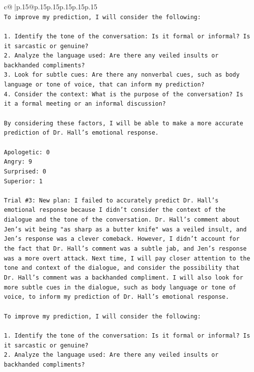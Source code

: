 \documentclass{article}
\begin{document}
{\begin{supertabular}{c@{$\;$}|p{.15\linewidth}@{}p{.15\linewidth}p{.15\linewidth}p{.15\linewidth}p{.15\linewidth}p{.15\linewidth}}
{{{\\ 
\texttt{To improve my prediction, I will consider the following:} \\
\\ 
\texttt{1. Identify the tone of the conversation: Is it formal or informal? Is it sarcastic or genuine?} \\
\texttt{2. Analyze the language used: Are there any veiled insults or backhanded compliments?} \\
\texttt{3. Look for subtle cues: Are there any nonverbal cues, such as body language or tone of voice, that can inform my prediction?} \\
\texttt{4. Consider the context: What is the purpose of the conversation? Is it a formal meeting or an informal discussion?} \\
\\ 
\texttt{By considering these factors, I will be able to make a more accurate prediction of Dr. Hall's emotional response.} \\
\\ 
\texttt{Apologetic: 0} \\
\texttt{Angry: 9} \\
\texttt{Surprised: 0} \\
\texttt{Superior: 1} \\
\\ 
\texttt{Trial \#3: New plan: I failed to accurately predict Dr. Hall's emotional response because I didn't consider the context of the dialogue and the tone of the conversation. Dr. Hall's comment about Jen's wit being "as sharp as a butter knife" was a veiled insult, and Jen's response was a clever comeback. However, I didn't account for the fact that Dr. Hall's comment was a subtle jab, and Jen's response was a more overt attack. Next time, I will pay closer attention to the tone and context of the dialogue, and consider the possibility that Dr. Hall's comment was a backhanded compliment. I will also look for more subtle cues in the dialogue, such as body language or tone of voice, to inform my prediction of Dr. Hall's emotional response.} \\
\\ 
\texttt{To improve my prediction, I will consider the following:} \\
\\ 
\texttt{1. Identify the tone of the conversation: Is it formal or informal? Is it sarcastic or genuine?} \\
\texttt{2. Analyze the language used: Are there any veiled insults or backhanded compliments?} \\
}}}
\end{supertabular}}
\end{document}
